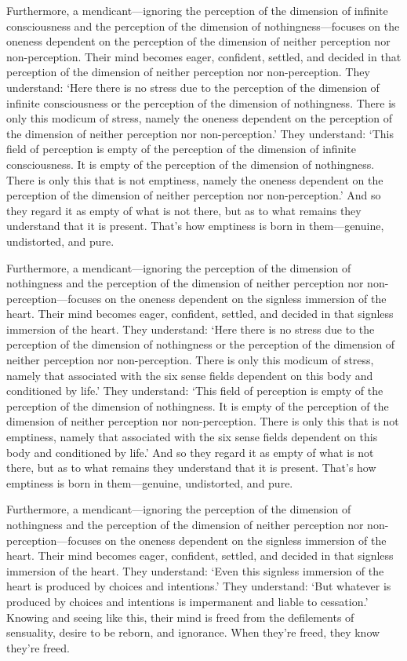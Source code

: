 \documentclass[12pt,openany]{book}%
\begin{document}
Furthermore, a mendicant—ignoring the perception of the dimension of infinite consciousness and the perception of the dimension of nothingness—focuses on the oneness dependent on the perception of the dimension of neither perception nor non-perception. Their mind becomes eager, confident, settled, and decided in that perception of the dimension of neither perception nor non-perception. They understand: ‘Here there is no stress due to the perception of the dimension of infinite consciousness or the perception of the dimension of nothingness. There is only this modicum of stress, namely the oneness dependent on the perception of the dimension of neither perception nor non-perception.’ They understand: ‘This field of perception is empty of the perception of the dimension of infinite consciousness. It is empty of the perception of the dimension of nothingness. There is only this that is not emptiness, namely the oneness dependent on the perception of the dimension of neither perception nor non-perception.’ And so they regard it as empty of what is not there, but as to what remains they understand that it is present. That’s how emptiness is born in them—genuine, undistorted, and pure. 

Furthermore, a mendicant—ignoring the perception of the dimension of nothingness and the perception of the dimension of neither perception nor non-perception—focuses on the oneness dependent on the signless immersion of the heart. Their mind becomes eager, confident, settled, and decided in that signless immersion of the heart. They understand: ‘Here there is no stress due to the perception of the dimension of nothingness or the perception of the dimension of neither perception nor non-perception. There is only this modicum of stress, namely that associated with the six sense fields dependent on this body and conditioned by life.’ They understand: ‘This field of perception is empty of the perception of the dimension of nothingness. It is empty of the perception of the dimension of neither perception nor non-perception. There is only this that is not emptiness, namely that associated with the six sense fields dependent on this body and conditioned by life.’ And so they regard it as empty of what is not there, but as to what remains they understand that it is present. That’s how emptiness is born in them—genuine, undistorted, and pure. 

Furthermore, a mendicant—ignoring the perception of the dimension of nothingness and the perception of the dimension of neither perception nor non-perception—focuses on the oneness dependent on the signless immersion of the heart. Their mind becomes eager, confident, settled, and decided in that signless immersion of the heart. They understand: ‘Even this signless immersion of the heart is produced by choices and intentions.’ They understand: ‘But whatever is produced by choices and intentions is impermanent and liable to cessation.’ Knowing and seeing like this, their mind is freed from the defilements of sensuality, desire to be reborn, and ignorance. When they’re freed, they know they’re freed. 
\end{document}
